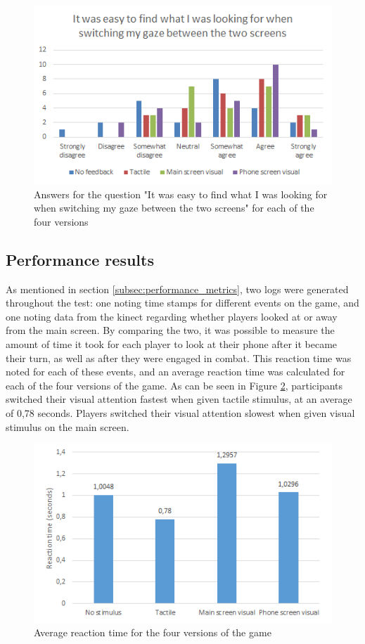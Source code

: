 \begin{figure}[h!]
	\centering
	\includegraphics[scale=1]{figures/questionnaire_f.png}
	\caption{Answers for the question "It was easy to find what I was looking for when switching my gaze between the two screens" for each of the four versions}\label{fig:questionnaire_f}
\end{figure}

\subsection{Performance results}
As mentioned in section \ref{subsec:performance_metrics}, two logs were generated throughout the test: one noting time stamps for different events on the game, and one noting data from the kinect regarding whether players looked at or away from the main screen. By comparing the two, it was possible to measure the amount of time it took for each player to look at their phone after it became their turn, as well as after they were engaged in combat. This reaction time was noted for each of these events, and an average reaction time was calculated for each of the four versions of the game. As can be seen in Figure \ref{fig:reaction_time}, participants switched their visual attention fastest when given tactile stimulus, at an average of 0,78 seconds. Players switched their visual attention slowest when given visual stimulus on the main screen.

\begin{figure}[h!]
	\centering
	\includegraphics[scale=1]{figures/reaction_time.png}
	\caption{Average reaction time for the four versions of the game}\label{fig:reaction_time}
\end{figure}

